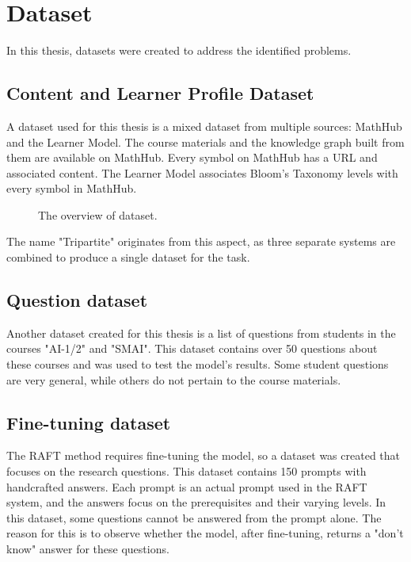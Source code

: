 \section{Dataset}
In this thesis, datasets were created to address the identified problems.
\subsection{Content and Learner Profile Dataset}
A dataset used for this thesis is a mixed dataset from multiple sources: MathHub and the Learner Model.
The course materials and the knowledge graph built from them are available on MathHub. Every symbol on MathHub has a URL and associated content.
The Learner Model associates Bloom's Taxonomy levels with every symbol in MathHub.
\begin{figure}[htbp]
  \centering


  \label{dataset_overview}
  \caption{The overview of dataset.}
\end{figure}
The name "Tripartite" originates from this aspect, as three separate systems are combined to produce a single dataset for the task.
\subsection{Question dataset}
Another dataset created for this thesis is a list of questions from students in the courses "AI-1/2" and "SMAI".
This dataset contains over 50 questions about these courses and was used to test the model's results.
Some student questions are very general, while others do not pertain to the course materials.
\subsection{Fine-tuning dataset}
\label{fine_tune_dataset}
The RAFT method requires fine-tuning the model, so a dataset was created that focuses on the
research questions. This dataset contains 150 prompts with handcrafted answers.
Each prompt is an actual prompt used in the RAFT system, and the answers focus on
the prerequisites and their varying levels.
In this dataset, some questions cannot be answered from the prompt alone. The reason for this is
to observe whether the model, after fine-tuning, returns a "don't know" answer for these questions.

